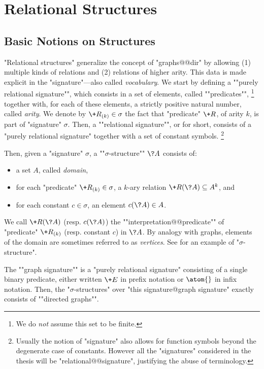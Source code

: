 \section{Relational Structures}

\subsection{Basic Notions on Structures}

"Relational structures" generalize the concept of "graphs@@dir"
by allowing (1) multiple kinds of relations and
(2) relations of higher arity. This data is made explicit in
the "signature"---also called \emph{vocabulary}.
We start by defining a \AP""purely relational signature"", which consists
in a set of elements, called ""predicates"",%
\footnote{We do \emph{not} assume this set to be finite.}
together with, for each
of these elements, a strictly positive natural number, called \emph{arity}.
We denote by $\+R_{(k)} \in \sigma$ the fact that "predicate" $\+R$, of arity
$k$, is part of "signature" $\sigma$.
Then, a \AP""relational signature"", or  for short, consists of a "purely relational 
signature" together with a set of constant symbols.%
\footnote{Usually the notion of "signature" also allows for function symbols beyond
the degenerate case of constants. However all the "signatures" considered in the thesis
will be "relational@@signature", justifying the abuse of terminology.}

Then, given a "signature" $\sigma$, a ""$\sigma$-structure"" $\?A$
consists of:
\begin{itemize}
	\item a set $A$, called \emph{domain},
	\item for each "predicate" $\+R_{(k)} \in \sigma$, a $k$-ary relation
		$\+R(\?A) \subseteq A^k$, and
	\item for each constant $c \in \sigma$, an element $c(\?A) \in A$.
\end{itemize}
We call $\+R(\?A)$ (resp. $c(\?A)$) the \AP""interpretation@@predicate""
of "predicate" $\+R_{(k)}$ (resp. constant $c$) in $\?A$.
By analogy with graphs, elements of the domain are sometimes referred to as
\emph{vertices}. See  for an example
of "$\sigma$-structure".

The \AP""graph signature"" is a "purely relational signature"
consisting of a single binary predicate, either written $\+E$ in prefix notation
or $\atom{}$ in infix notation.
Then, the "$\sigma$-structures" over "this signature@graph signature"
exactly consists of \AP""directed graphs"".

